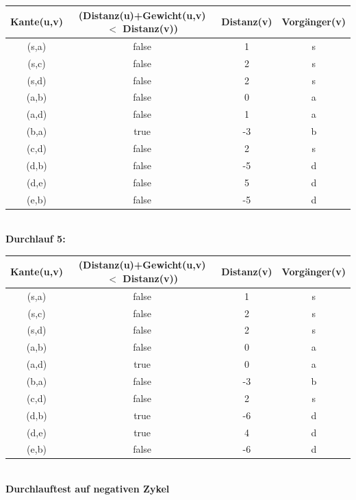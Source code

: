 \documentclass[paper=a4, fontsize=11pt]{scrartcl}
\numberwithin{equation}{section}
\numberwithin{figure}{section}
\numberwithin{table}{section}
\begin{document}
\begin{tabular}{|c||c|c|c|}
\hline
Kante(u,v) & (Distanz(u)+Gewicht(u,v) $<$ Distanz(v)) & Distanz(v) & Vorgänger(v) \\
\hline \hline
(s,a) & false & 1 & s \\\hline
(s,c) & false & 2 & s \\\hline
(s,d) & false & 2 & s \\\hline
(a,b) & false & 0 & a \\\hline
(a,d) & false & 1 & a \\\hline
(b,a) & true & -3 & b \\\hline
(c,d) & false & 2 & s \\\hline
(d,b) & false & -5 & d \\\hline
(d,e) & false & 5 & d \\\hline
(e,b) & false & -5 & d \\\hline
\end{tabular} \\

\textbf{Durchlauf 5:} \\

\begin{tabular}{|c||c|c|c|}
\hline
Kante(u,v) & (Distanz(u)+Gewicht(u,v) $<$ Distanz(v)) & Distanz(v) & Vorgänger(v) \\
\hline \hline
(s,a) & false & 1 & s \\\hline
(s,c) & false & 2 & s \\\hline
(s,d) & false & 2 & s \\\hline
(a,b) & false & 0 & a \\\hline
(a,d) & true & 0 & a \\\hline
(b,a) & false & -3 & b \\\hline
(c,d) & false & 2 & s \\\hline
(d,b) & true & -6 & d \\\hline
(d,e) & true & 4 & d \\\hline
(e,b) & false & -6 & d \\\hline
\end{tabular} \\

\textbf{Durchlauftest auf negativen Zykel} \\
\end{document}

